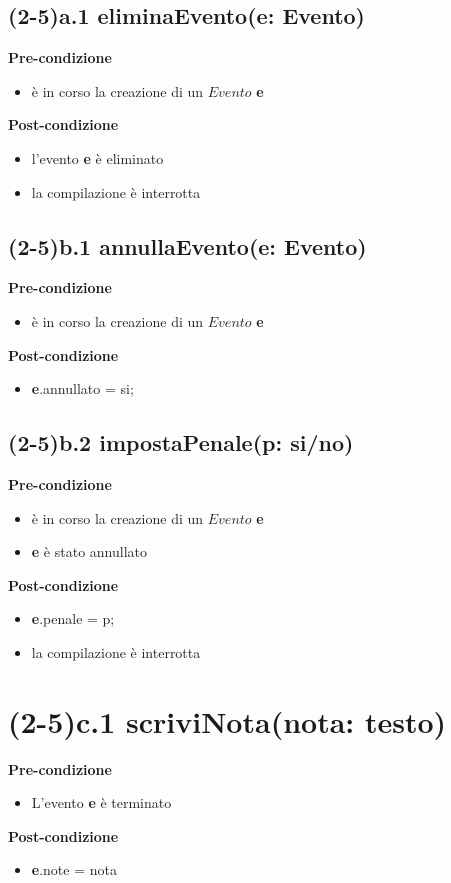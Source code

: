 \documentclass[12pt]{extarticle}
\begin{document}
\subsection*{(2-5)a.1 eliminaEvento(e: Evento)}

\textbf{Pre-condizione}
\begin{itemize}
  \item è in corso la creazione di un $Evento$ \textbf{e}
\end{itemize}
\textbf{Post-condizione}
\begin{itemize}
  \item l'evento \textbf{e} è eliminato
  \item la compilazione è interrotta
\end{itemize}  


\subsection*{(2-5)b.1 annullaEvento(e: Evento)}

\textbf{Pre-condizione}
\begin{itemize}
  \item è in corso la creazione di un $Evento$ \textbf{e}
\end{itemize}
\textbf{Post-condizione}
\begin{itemize}
  \item \textbf{e}.annullato = si;
\end{itemize}  


\subsection*{(2-5)b.2 impostaPenale(p: si/no)}
\textbf{Pre-condizione}
\begin{itemize}
  \item è in corso la creazione di un $Evento$ \textbf{e}
  \item \textbf{e} è stato annullato
\end{itemize}
\textbf{Post-condizione}
\begin{itemize}
  \item \textbf{e}.penale = p;
  \item la compilazione è interrotta
\end{itemize}  

\section*{(2-5)c.1 scriviNota(nota: testo)}
\textbf{Pre-condizione}
\begin{itemize}
  \item L'evento \textbf{e} è terminato
\end{itemize}
\textbf{Post-condizione}
\begin{itemize}
  \item \textbf{e}.note = nota
\end{itemize}
\end{document}
